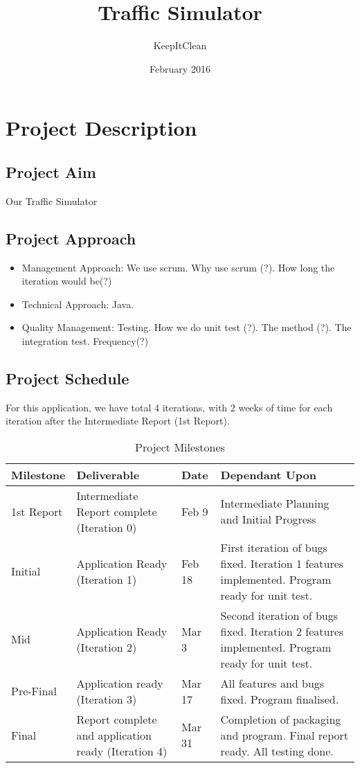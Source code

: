 \documentclass[11pt]{article}
\author{KeepItClean}
\title{Traffic Simulator}
\date{February 2016}
\begin{document}
\maketitle
\newpage

\section{Project Description}
\subsection{Project Aim}
Our Traffic Simulator 
\subsection{Project Approach}
\begin{itemize}
	\item Management Approach: We use scrum. Why use scrum (?). How long the iteration would be(?)
	\item Technical Approach: Java. 
	\item Quality Management: Testing. How we do unit test (?). The method (?). The integration test. Frequency(?)
\end{itemize}
\subsection{Project Schedule}
 For this application, we have total 4 iterations, with 2 weeks of time for each iteration after the Intermediate Report (1st Report). 
 	\begin{table}[ht]
		\caption{Project Milestones} %
		\centering %
		\begin{tabular}{p{2cm}|p{4cm}|p{2cm}|p{4cm}} %
		\hline\hline %
		Milestone & Deliverable & Date & Dependant Upon \\ [0.5ex] %
		\hline
		
		1st Report & Intermediate Report complete (Iteration 0) & Feb 9 & Intermediate Planning and Initial Progress\\
		
		Initial & Application Ready (Iteration 1) & Feb 18 & First iteration of bugs fixed. Iteration 1 features implemented. Program ready for unit test.  \\ 
		
		Mid & Application Ready (Iteration 2) & Mar 3 &  Second iteration of bugs fixed. Iteration 2 features implemented. Program ready for unit test.\\
		
		Pre-Final & Application ready (Iteration 3) & Mar 17 & All features and bugs fixed. Program finalised. \\
		
		Final & Report complete and application ready (Iteration 4)  & Mar 31 & Completion of packaging and program. Final report ready. All testing done. \\[1ex] %
		\hline
		\end{tabular}
		\label{table:milestones} %
	\end{table}
\end{document}
